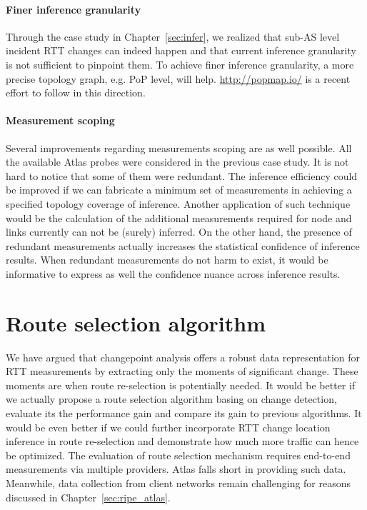 \paragraph*{Finer inference granularity} Through the case study in Chapter~\ref{sec:infer}, we realized that sub-AS level incident RTT changes can indeed happen and that current inference granularity is not sufficient to pinpoint them.
To achieve finer inference granularity, a more precise topology graph, e.g. \ac{PoP} level, will help. \url{http://popmap.io/} is a recent effort to follow in this direction.

\paragraph*{Measurement scoping} Several improvements regarding measurements scoping are as well possible. All the available Atlas probes were considered in the previous case study. It is not hard to notice that some of them were redundant.
The inference efficiency could be improved if we can fabricate a minimum set of measurements in achieving a specified topology coverage of inference.
Another application of such technique would be the calculation of the additional measurements required for node and links currently can not be (surely) inferred.
On the other hand, the presence of redundant measurements actually increases the statistical confidence of inference results. When redundant measurements do not harm to exist, it would be informative to express as well the confidence nuance across inference results.



\section{Route selection algorithm}
We have argued that changepoint analysis offers a robust data representation for RTT measurements by extracting only the moments of significant change. These moments are when route re-selection is potentially needed. It would be better if we actually propose a route selection algorithm basing on change detection, evaluate its the performance gain and compare its gain to previous algorithms.
It would be even better if we could further incorporate RTT change location inference in route re-selection and demonstrate how much more traffic can hence be optimized.
The evaluation of route selection mechanism requires end-to-end measurements via multiple providers.
Atlas falls short in providing such data.
Meanwhile, data collection from client networks remain challenging for reasons discussed in Chapter~\ref{sec:ripe_atlas}.
 